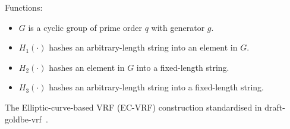 \begin{algorithm}[]
    \SetAlgoLined\DontPrintSemicolon

    Functions:
    \begin{itemize}
        \item $G$ is a cyclic group of prime order $q$ with generator $g$.
        \item $H_1(\cdot)$ hashes an arbitrary-length string into an element in $G$.
        \item $H_2(\cdot)$ hashes an element in $G$ into a fixed-length string.
        \item $H_3(\cdot)$ hashes an arbitrary-length string into a fixed-length string.
    \end{itemize}





    \label{algo:standard-ecvrf}
    \caption{The Elliptic-curve-based VRF (EC-VRF) construction standardised in draft-goldbe-vrf~\cite{goldberg2017draft}.}
\end{algorithm}
